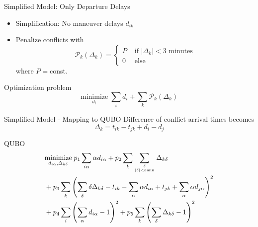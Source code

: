 \documentclass[10pt]{beamer}
\begin{document}
\begin{frame}[t]{Simplified Model: Only Departure Delays}
    \begin{itemize}
        \item Simplification: No maneuver delays $d_{ik}$
        \item Penalize conflicts with
            \begin{equation*}
                \mathcal{P}_k(\Delta_k) = 
                \begin{cases}
                    P & \text{ if } | \Delta_k | < 3 \text{ minutes} \\
                    0 &\text{ else }
                \end{cases}
            \end{equation*}
            where $P = $const.
    \end{itemize}
    \begin{block}{Optimization problem}
        \begin{equation*}
            \underset{d_i}{\text{minimize}} \; \sum_i d_i + \sum_{k} \mathcal{P}_k(\Delta_k)
        \end{equation*}
    \end{block}
\end{frame}
\begin{frame}[t]{Simplified Model - Mapping to QUBO}
    Difference of conflict arrival times becomes
    \vspace{-0.2cm}
    \begin{equation*}
        \Delta_k = t_{ik} - t_{jk} + d_i - d_j
    \end{equation*}
    \vspace{-0.7cm}
    \begin{block}{QUBO}
        \begin{align*}
            &\underset{d_{i\alpha}, \Delta_{k\delta}}{\text{minimize}} \; p_1 \sum_{i\alpha} \alpha d_{i\alpha} 
            + p_2 \sum_{k}\sum_{\delta \atop |\delta| < 3 \text{min}} \Delta_{k\delta} \\
            &+ p_3 \sum_k \left(\sum_\delta \delta \Delta_{k\delta} - t_{ik} - \sum_\alpha \alpha d_{i\alpha} + t_{jk} + \sum_\alpha \alpha d_{j\alpha} \right)^2 \\
            &+ p_4 \sum_i \left(\sum_\alpha d_{i\alpha} - 1 \right)^2 + p_5 \sum_k \left(\sum_\delta \Delta_{k\delta} - 1 \right)^2
        \end{align*}
    \end{block}
\end{frame}
\end{document}
